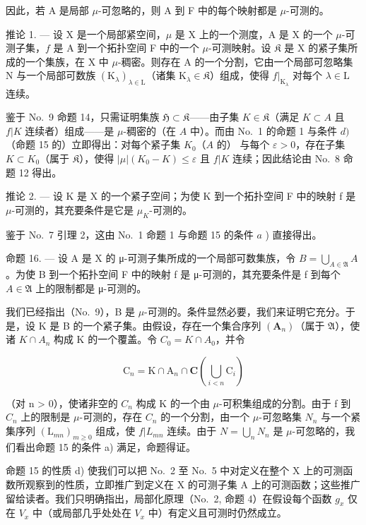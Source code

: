 因此，若 A 是局部 \(\mu\)-可忽略的，则 A 到 F 中的每个映射都是 \(\mu\)-可测的。

推论 1. --- 设 X 是一个局部紧空间，\(\mu\) 是 X 上的一个测度，A 是 X 的一个 \(\mu\)-可测子集，\(f\) 是 A 到一个拓扑空间 F 中的一个 \(\mu\)-可测映射。设 \(\mathfrak{K}\) 是 X 的紧子集所成的一个集族，在 X 中 \(\mu\)-稠密。则存在 A 的一个分割，它由一个局部可忽略集 N 与一个局部可数族 \((\mathrm{K}_{\lambda})_{\lambda \in \mathrm{L}}\)（诸集 \(\mathrm{K}_{\lambda} \in \mathfrak{K}\)）组成，使得 \(f|_{\mathrm{K}_{\lambda}}\) 对每个 \(\lambda \in \mathrm{L}\) 连续。

鉴于 No.~9 命题 14，只需证明集族 \(\mathfrak{H} \subset \mathfrak{K}\)——由子集 \(K \in \mathfrak{K}\)（满足 \(K \subset A\) 且 \(f|K\) 连续者）组成——是 \(\mu\)-稠密的（在 \(A\) 中）。而由 No.~1 的命题 1 与条件 \(d)\)（命题 15 的）立即得出：对每个紧子集 \(K_0\)（\(A\) 的） 与每个 \(\varepsilon > 0\)，存在子集 \(K \subset K_0\)（属于 \(\mathfrak{K}\)），使得 \(|\mu|(K_0 - K) \leqslant \varepsilon\) 且 \(f|K\) 连续；因此结论由 No.~8 命题 12 得出。

推论 2. --- 设 K 是 X 的一个紧子空间；为使 K 到一个拓扑空间 F 中的映射 f 是 \(\mu\)-可测的，其充要条件是它是 \(\mu_{K}\)-可测的。

鉴于 No.~7 引理 2，这由 No.~1 命题 1 与命题 15 的条件 \(a\) ) 直接得出。

命题 16. --- 设 A 是 X 的 μ-可测子集所成的一个局部可数集族，令 \(B = \bigcup_{A \in \mathfrak{A}} A\) 。为使 B 到一个拓扑空间 F 中的映射 f 是 μ-可测的，其充要条件是 f 到每个 \(A \in \mathfrak{A}\) 上的限制都是 μ-可测的。

我们已经指出（No.~9），B 是 \(\mu\)-可测的。条件显然必要，我们来证明它充分。于是，设 K 是 B 的一个紧子集。由假设，存在一个集合序列 \((\mathbf{A}_{n})\)（属于 \(\mathfrak{A}\)），使诸 \(K \cap A_{n}\) 构成 K 的一个覆盖。令 \(C_{0} = K \cap A_{0}\)，并令

\[
\mathrm{C} _ {n} = \mathrm{K} \cap \mathrm{A} _ {n} \cap \mathbf {C} \left(\bigcup_ {i <   n} \mathrm{C} _ {i}\right)
\]

（对 n \textgreater{} 0），使诸非空的 \(C_{n}\) 构成 K 的一个由 \(\mu\)-可积集组成的分割。由于 f 到 \(C_{n}\) 上的限制是 \(\mu\)-可测的，存在 \(C_{n}\) 的一个分割，由一个 \(\mu\)-可忽略集 \(N_{n}\) 与一个紧集序列 \((\mathrm{L}_{mn})_{m \geqslant 0}\) 组成，使 \(f|L_{mn}\) 连续。由于 \(N = \bigcup_{n} N_{n}\) 是 \(\mu\)-可忽略的，我们看出命题 15 的条件 a) 满足，命题得证。

命题 15 的性质 d) 使我们可以把 No.~2 至 No.~5 中对定义在整个 X 上的可测函数所观察到的性质，立即推广到定义在 X 的可测子集 A 上的可测函数；这些推广留给读者。我们只明确指出，局部化原理（No.~2, 命题 4）在假设每个函数 \(g_{x}\) 仅在 \(V_{x}\) 中（或局部几乎处处在 \(V_{x}\) 中）有定义且可测时仍然成立。


